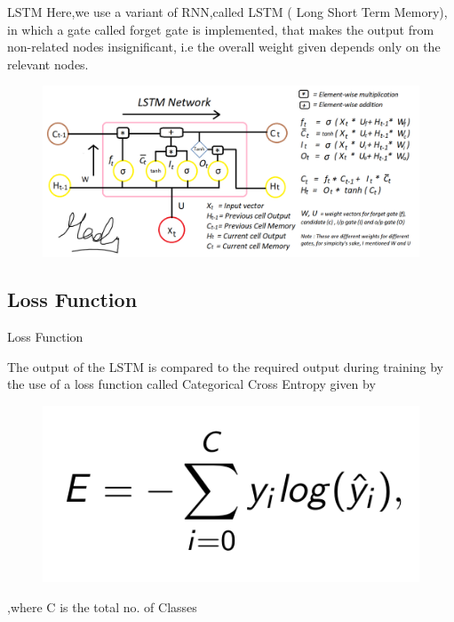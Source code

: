 \documentclass{if-beamer}
\begin{document}
\begin{frame}{LSTM}
Here,we use a variant of RNN,called LSTM ( Long Short Term Memory), in which a gate called forget gate is implemented, that makes the output from non-related nodes insignificant, i.e the overall weight given depends only on the relevant nodes.
\begin{figure}
\centering
\includegraphics[width=0.8\columnwidth]{LSTM.png}
\label{fig:FinalPres1}
\end{figure}
\end{frame}
\subsection{Loss Function}
\begin{frame}{Loss Function}

The output of the LSTM is compared to the required output during training by the use of a loss function called Categorical Cross Entropy given by

\begin{figure}
\centering
\includegraphics[width=0.3\columnwidth]{CCE.png}
\label{fig:FinalPres1}
\end{figure}
\end{frame}
,where C is the total no. of Classes
\end{document}
